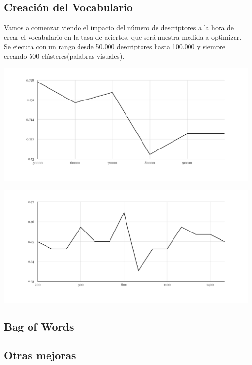 \documentclass[a4paper,12pt]{article}
\begin{document}
\subsection{Creación del Vocabulario}
Vamos a comenzar viendo el impacto del número de descriptores a la hora de
crear el vocabulario en la tasa de aciertos, que será nuestra medida a 
optimizar. Se ejecuta con un rango desde 50.000 descriptores hasta 100.000 y 
siempre creando 500 clústeres(palabras visuales). 

\includegraphics[width=15cm]{charts/descriptors}


\includegraphics[width=15cm]{charts/clusters}



\subsection{Bag of Words}




\subsection{Otras mejoras}
\end{document}
